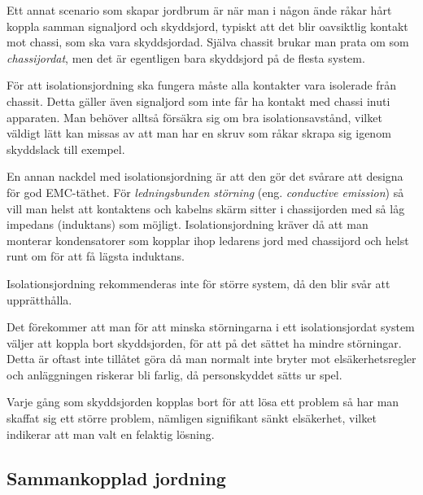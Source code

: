 Ett annat scenario som skapar jordbrum är när man i någon ände råkar hårt
koppla samman signaljord och skyddsjord, typiskt att det blir oavsiktlig
kontakt mot chassi, som ska vara skyddsjordad.
Själva chassit brukar man prata om som \emph{chassijordat}, men det är
egentligen bara skyddsjord på de flesta system.

För att isolationsjordning ska fungera måste alla kontakter vara isolerade från
chassit.
Detta gäller även signaljord som inte får ha kontakt med chassi inuti apparaten.
Man behöver alltså försäkra sig om bra isolationsavstånd, vilket väldigt lätt
kan missas av att man har en skruv som råkar skrapa sig igenom skyddslack till
exempel.

En annan nackdel med isolationsjordning är att den gör det svårare att designa
för god EMC-täthet.
För \emph{ledningsbunden störning} (eng. \emph{conductive emission}) så vill
man helst att kontaktens och kabelns skärm sitter i chassijorden med så låg
impedans (induktans) som möjligt.
Isolationsjordning kräver då att man monterar kondensatorer som kopplar ihop
ledarens jord med chassijord och helst runt om för att få lägsta induktans.

Isolationsjordning rekommenderas inte för större system, då den blir svår
att upprätthålla.

Det förekommer att man för att minska störningarna i ett isolationsjordat
system väljer att koppla bort skyddsjorden, för att på det sättet ha mindre
störningar.
Detta är oftast inte tillåtet göra då man normalt inte bryter mot
elsäkerhetsregler och anläggningen riskerar bli farlig, då personskyddet
sätts ur spel.

\begin{center}
\begin{minipage}{0.19\columnwidth}
\Huge{\selectfont{}\relax}
\end{minipage}
\begin{minipage}{0.7\columnwidth}
Varje gång som skyddsjorden kopplas bort för att lösa ett problem så
har man skaffat sig ett större problem, nämligen signifikant sänkt
elsäkerhet, vilket indikerar att man valt en felaktig lösning.
\end{minipage}
\end{center}

\subsection{Sammankopplad jordning}

